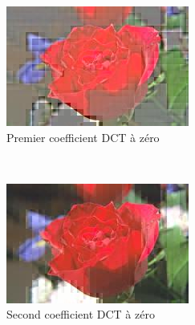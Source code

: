 \begin{figure}[H]
    \centering
    \begin{subfigure}[b]{0.3\textwidth}
        \includegraphics[width=\textwidth]{img/tot0.jpg}
        \caption{Premier coefficient DCT à zéro}
        \label{img:5}
    \end{subfigure}
    ~ %
    \begin{subfigure}[b]{0.3\textwidth}
        \includegraphics[width=\textwidth]{img/tot1.jpg}
        \caption{Second coefficient DCT à zéro}
        \label{img:6}
    \end{subfigure}
    ~ %
    \begin{subfigure}[b]{0.3\textwidth}

\end{subfigure}
\end{figure}
